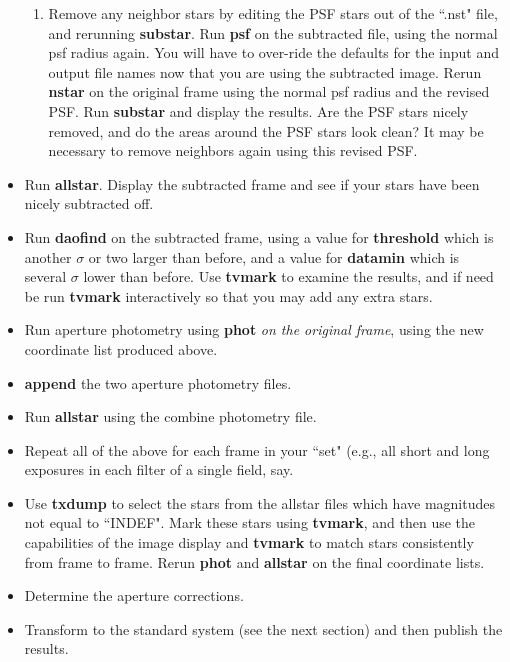 \begin{itemize}
\begin {enumerate}
	and display the
	resultant subtracted frame {\bf imagename.sub.1}.  Do the residuals
	of the PSF stars look consistent, or is one of them funny?  If need
	be, start over. 
	\item Remove any neighbor stars by editing the PSF stars out of the
	``.nst"  file, and rerunning {\bf substar}.  Run
	{\bf psf} on the subtracted file, using the normal psf radius again.
	You will have to over-ride the defaults for the input and output file
	names now that you are using the subtracted image.  Rerun {\bf nstar}
	on the original frame using the normal psf radius and the revised
	PSF. Run {\bf substar} and display the results.  Are the PSF stars
	nicely removed, and do the areas around the PSF stars look clean?
	It may be necessary to remove neighbors again using this revised
	PSF.
	\end {enumerate}
\item Run {\bf allstar}.  Display the subtracted frame and see if your stars
	have been nicely subtracted off.
\item Run {\bf daofind} on the subtracted frame, using a value for 
       {\bf threshold} which is another $\sigma$ or two larger than before,
       and a value for {\bf datamin} which is several $\sigma$ lower than
       before.  Use {\bf tvmark} to examine the results, and if need be
       run {\bf tvmark} interactively so that you may add any extra stars.
\item Run aperture photometry using {\bf phot} {\it on the original frame},
      using the new coordinate list produced above.
\item {\bf append} the two aperture photometry files.
\item Run {\bf allstar} using the combine photometry file.
\item Repeat all of the above for each frame in your ``set" (e.g., all short
      and long exposures in each filter of a single field, say.
\item Use {\bf txdump} to select the stars from the allstar files which
      have magnitudes not equal to ``INDEF".  Mark these stars using
      {\bf tvmark}, and then use the capabilities of the image display
      and {\bf tvmark} to match stars consistently from frame to frame.
      Rerun {\bf phot} and {\bf allstar} on the final coordinate lists.
\item Determine the aperture corrections.
\item Transform
	to the standard system (see the next section) and then
      publish the results.
\end{itemize}

